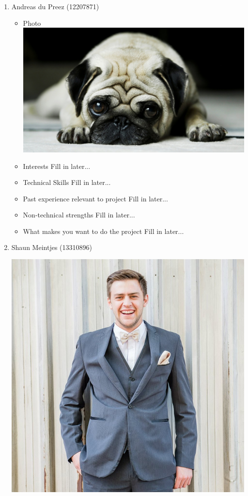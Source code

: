 \documentclass[12pt, oneside]{article}
\begin{document}
\begin{enumerate}
		\item {Andreas du Preez (12207871)\par}
		\begin{itemize}
			\item Photo\newline
				\includegraphics[scale=0.1]{example} %
			\item Interests\newline
				Fill in later...
			\item Technical Skills\newline
				Fill in later...
			\item Past experience relevant to project\newline
				Fill in later...
			\item Non-technical strengths\newline
				Fill in later...
			\item What makes you want to do the project\newline
				Fill in later...
		\end{itemize}
		\item {Shaun Meintjes (13310896)\par}
		\begin{itemize}
				\includegraphics[scale=0.1]{Shaun} %

\end{itemize}
\end{enumerate}
\end{document}
